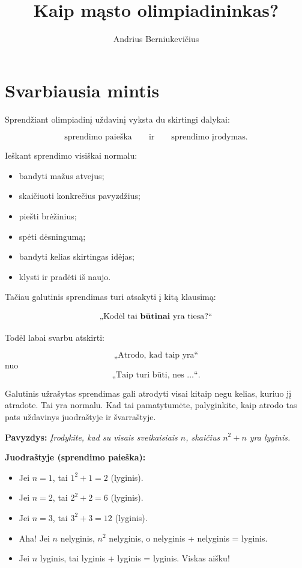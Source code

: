 \documentclass[11pt,a4paper]{scrartcl}
\title{Kaip mąsto olimpiadininkas?}
\author{Andrius Berniukevičius}
\begin{document}
\maketitle

\section{Svarbiausia mintis}

Sprendžiant olimpiadinį uždavinį vyksta du skirtingi dalykai:

\[
\boxed{\text{sprendimo paieška}}
\qquad\text{ir}\qquad
\boxed{\text{sprendimo įrodymas}}.
\]

Ieškant sprendimo visiškai normalu:

\begin{itemize}
    \item bandyti mažus atvejus;
    \item skaičiuoti konkrečius pavyzdžius;
    \item piešti brėžinius;
    \item spėti dėsningumą;
    \item bandyti kelias skirtingas idėjas;
    \item klysti ir pradėti iš naujo.
\end{itemize}

Tačiau galutinis sprendimas turi atsakyti į kitą klausimą:

\[
\text{„Kodėl tai \textbf{būtinai} yra tiesa?“}
\]

Todėl labai svarbu atskirti:

\[
\text{„Atrodo, kad taip yra“}
\]
nuo
\[
\text{„Taip turi būti, nes \ldots“}.
\]

Galutinis užrašytas sprendimas gali atrodyti visai kitaip negu kelias,
kuriuo jį atradote. Tai yra normalu. Kad tai pamatytumėte, palyginkite, kaip atrodo tas pats uždavinys juodraštyje ir švarraštyje.

\bigskip
\textbf{Pavyzdys:} \textit{Įrodykite, kad su visais sveikaisiais $n$, skaičius $n^2+n$ yra lyginis.}

\noindent
\textbf{Juodraštyje (sprendimo paieška):}
\begin{itemize}
    \item Jei $n=1$, tai $1^2+1 = 2$ (lyginis).
    \item Jei $n=2$, tai $2^2+2 = 6$ (lyginis).
    \item Jei $n=3$, tai $3^2+3 = 12$ (lyginis).
    \item Aha! Jei $n$ nelyginis, $n^2$ nelyginis, o nelyginis + nelyginis = lyginis.
    \item Jei $n$ lyginis, tai lyginis + lyginis = lyginis. Viskas aišku!
\end{itemize}
\end{document}
